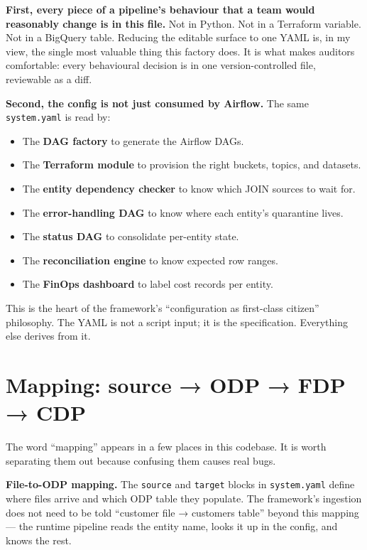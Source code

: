 \documentclass[
  11pt,
  british,
  oneside]{book}
\providecommand{\tightlist}{%
  \setlength{\itemsep}{0pt}\setlength{\parskip}{0pt}}
\begin{document}
\textbf{First, every piece of a pipeline's behaviour that a team would
reasonably change is in this file.} Not in Python. Not in a Terraform
variable. Not in a BigQuery table. Reducing the editable surface to one
YAML is, in my view, the single most valuable thing this factory does.
It is what makes auditors comfortable: every behavioural decision is in
one version-controlled file, reviewable as a diff.

\textbf{Second, the config is not just consumed by Airflow.} The same
\texttt{system.yaml} is read by:

\begin{itemize}
\tightlist
\item
  The \textbf{DAG factory} to generate the Airflow DAGs.
\item
  The \textbf{Terraform module} to provision the right buckets, topics,
  and datasets.
\item
  The \textbf{entity dependency checker} to know which JOIN sources to
  wait for.
\item
  The \textbf{error-handling DAG} to know where each entity's quarantine
  lives.
\item
  The \textbf{status DAG} to consolidate per-entity state.
\item
  The \textbf{reconciliation engine} to know expected row ranges.
\item
  The \textbf{FinOps dashboard} to label cost records per entity.
\end{itemize}

This is the heart of the framework's ``configuration as first-class
citizen'' philosophy. The YAML is not a script input; it is the
specification. Everything else derives from it.

\hypertarget{mapping-source-odp-fdp-cdp}{%
\section{Mapping: source → ODP → FDP →
CDP}\label{mapping-source-odp-fdp-cdp}}

The word ``mapping'' appears in a few places in this codebase. It is
worth separating them out because confusing them causes real bugs.

\textbf{File-to-ODP mapping.} The \texttt{source} and \texttt{target}
blocks in \texttt{system.yaml} define where files arrive and which ODP
table they populate. The framework's ingestion does not need to be told
``customer file → customers table'' beyond this mapping --- the runtime
pipeline reads the entity name, looks it up in the config, and knows the
rest.
\end{document}
